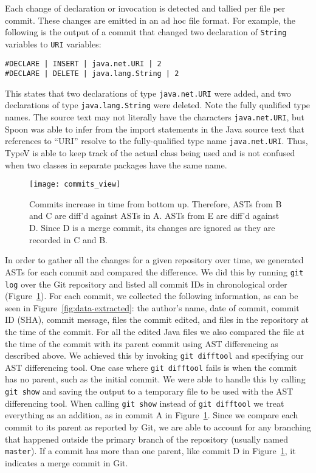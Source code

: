 Each change of declaration or invocation is detected and tallied per file per commit. These changes are emitted in an ad hoc file format. For example, the following is the output of a commit that changed two declaration of \texttt{String} variables to \texttt{URI} variables:

\begin{verbatim}
#DECLARE | INSERT | java.net.URI | 2
#DECLARE | DELETE | java.lang.String | 2
\end{verbatim}

This states that two declarations of type \texttt{java.net.URI} were added, and two declarations of type \texttt{java.lang.String} were deleted. Note the fully qualified type names. The source text may not literally have the characters \texttt{java.net.URI}, but Spoon was able to infer from the import statements in the Java source text that references to ``URI'' resolve to the fully-qualified type name \texttt{java.net.URI}. Thus, TypeV is able to keep track of the actual class being used and is not confused when two classes in separate packages have the same name.

\begin{figure}[h]
\centering
\texttt{[image: commits\_view]}
\caption{Commits increase in time from bottom up. Therefore, ASTs from B and C are diff'd against ASTs in A. ASTs from E are diff'd against D. Since D is a merge commit, its changes are ignored as they are recorded in C and B.}
\label{fig:commits}
\end{figure}

In order to gather all the changes for a given repository over time, we generated ASTs for each commit and compared the difference. We did this by running \texttt{git log} over the Git repository and listed all commit IDs in chronological order (Figure~\ref{fig:commits}). For each commit, we collected the following information, as can be seen in Figure~\ref{fig:data-extracted}: the author's name, date of commit, commit ID (SHA), commit message, files the commit edited, and files in the repository at the time of the commit. For all the edited Java files we also compared the file at the time of the commit with its parent commit using AST differencing as described above. We achieved this by invoking \texttt{git difftool} and specifying our AST differencing tool. One case where \texttt{git difftool} fails is when the commit has no parent, such as the initial commit. We were able to handle this by calling \texttt{git show} and saving the output to a temporary file to be used with the AST differencing tool. When calling \texttt{git show} instead of \texttt{git difftool} we treat everything as an addition, as in commit A in Figure~\ref{fig:commits}. Since we compare each commit to its parent as reported by Git, we are able to account for any branching that happened outside the primary branch of the repository (usually named \texttt{master}). If a commit has more than one parent, like commit D in Figure~\ref{fig:commits}, it indicates a merge commit in Git.

